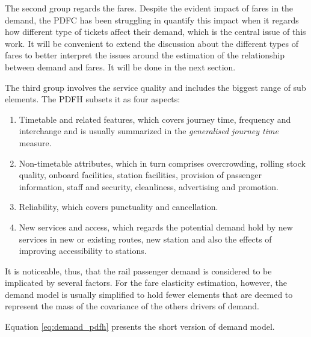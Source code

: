 The second group regards the fares. Despite the evident impact of fares in the demand, the PDFC has been struggling in quantify this impact when it regards how different type of tickets affect their demand, which is the central issue of this work. It will be convenient to extend the discussion about the different types of fares to better interpret the issues around the estimation of the relationship between demand and fares. It will be done in the next section.


The third group involves the service quality and includes the biggest range of sub elements. The PDFH subsets it as four aspects: 

\begin{enumerate} [label=(\roman*)]
\item Timetable and related features, which covers journey time, frequency and interchange and is usually summarized in the \textit{generalised journey time} measure. 

\item Non-timetable attributes, which in turn comprises overcrowding, rolling stock quality, onboard facilities, station facilities, provision of passenger information, staff and security, cleanliness, advertising and promotion. 

\item Reliability, which covers punctuality and cancellation. 

\item New services and access, which regards the potential demand hold by new services in new or existing routes, new station and also the effects of improving accessibility to stations.
\end{enumerate}

It is noticeable, thus, that the rail passenger demand is considered to be implicated by several factors. For the fare elasticity estimation, however, the demand model is usually simplified to hold fewer elements that are deemed to represent the mass of the covariance of the others drivers of demand. 

Equation \ref{eq:demand_pdfh} presents the short version of demand model.

